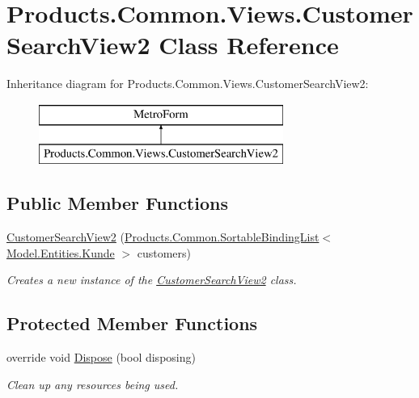 \hypertarget{class_products_1_1_common_1_1_views_1_1_customer_search_view2}{}\section{Products.\+Common.\+Views.\+Customer\+Search\+View2 Class Reference}
\label{class_products_1_1_common_1_1_views_1_1_customer_search_view2}
Inheritance diagram for Products.\+Common.\+Views.\+Customer\+Search\+View2\+:\begin{figure}[H]
\begin{center}
\leavevmode
\includegraphics[height=2.000000cm]{class_products_1_1_common_1_1_views_1_1_customer_search_view2}
\end{center}
\end{figure}
\subsection*{Public Member Functions}
\begin{DoxyCompactItemize}
\item 
\hyperlink{class_products_1_1_common_1_1_views_1_1_customer_search_view2_a37e25f984aa021005f1dfaf3c4c02133}{Customer\+Search\+View2} (\hyperlink{class_products_1_1_common_1_1_sortable_binding_list}{Products.\+Common.\+Sortable\+Binding\+List}$<$ \hyperlink{class_products_1_1_model_1_1_entities_1_1_kunde}{Model.\+Entities.\+Kunde} $>$ customers)
\begin{DoxyCompactList}\small\item\em Creates a new instance of the \hyperlink{class_products_1_1_common_1_1_views_1_1_customer_search_view2}{Customer\+Search\+View2} class. \end{DoxyCompactList}\end{DoxyCompactItemize}
\subsection*{Protected Member Functions}
\begin{DoxyCompactItemize}
\item 
override void \hyperlink{class_products_1_1_common_1_1_views_1_1_customer_search_view2_a36da7ca5db2dcad1f19e2cb64e4a0472}{Dispose} (bool disposing)
\begin{DoxyCompactList}\small\item\em Clean up any resources being used. \end{DoxyCompactList}\end{DoxyCompactItemize}
